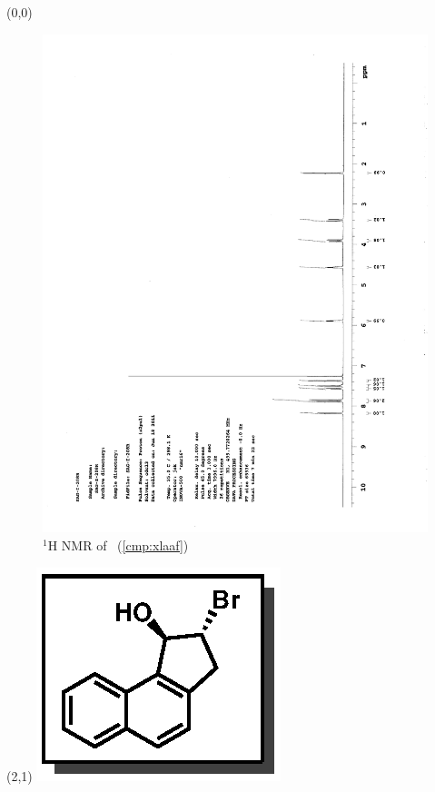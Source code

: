 \begin{textblock}{20}(0,0)
\begin{figure}[htb]
\caption{$^1$H NMR of \CMPxlaaf\ (\ref{cmp:xlaaf})}
\includegraphics[scale=0.75, trim = 0mm 0mm 0mm 5mm,
clip]{chp_asymmetric/images/nmr/xlaafH}
\vspace{-100pt}
\end{figure}
\end{textblock}
\begin{textblock}{1}(2,1)
\includegraphics[scale=0.8, angle=90]{chp_asymmetric/images/xlaaf}
\end{textblock}
